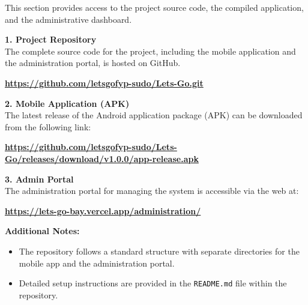 This section provides access to the project source code, the compiled application, and the administrative dashboard.

\vspace{0.5cm}

\textbf{1. Project Repository} \\
The complete source code for the project, including the mobile application and the administration portal, is hosted on GitHub.
\begin{center}
    \textbf{\url{https://github.com/letsgofyp-sudo/Lets-Go.git}}
\end{center}

\vspace{0.5cm}

\textbf{2. Mobile Application (APK)} \\
The latest release of the Android application package (APK) can be downloaded from the following link:
\begin{center}
    \textbf{\url{https://github.com/letsgofyp-sudo/Lets-Go/releases/download/v1.0.0/app-release.apk}}
\end{center}

\vspace{0.5cm}

\textbf{3. Admin Portal} \\
The administration portal for managing the system is accessible via the web at:
\begin{center}
    \textbf{\url{https://lets-go-bay.vercel.app/administration/}}
\end{center}

\vspace{1cm}

\textbf{Additional Notes:}

\begin{itemize}
    \item The repository follows a standard structure with separate directories for the mobile app and the administration portal.
    \item Detailed setup instructions are provided in the \texttt{README.md} file within the repository.
\end{itemize}

